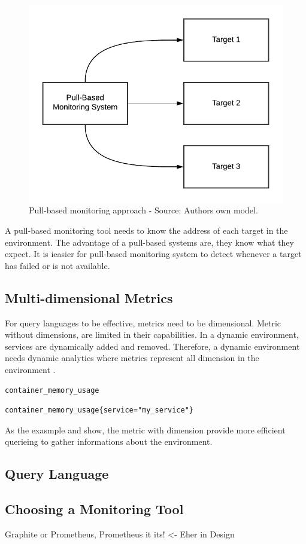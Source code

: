 \begin{figure}[h]%
\centering
\includegraphics[scale=0.8]{images/02_theoretical_foundation/monitoring/pull_based}%
\caption{Pull-based monitoring approach - Source: Authors own model.}%
\label{fig:mon_pull-based}%
\end{figure}
A pull-based monitoring tool needs to know the address of each target in the environment.
The advantage of a pull-based systems are, they know what they expect. It is ieasier for pull-based monitoring system to detect whenever a target has failed or is not available.


\subsection{Multi-dimensional Metrics}
For query languages to be effective, metrics need to be dimensional. Metric without dimensions, are limited in their capabilities.
In a dynamic environment, services are dynamically added and removed. Therefore, a dynamic environment needs dynamic analytics where metrics represent all dimension in the environment \cite{Farcic2018Toolkit22}.
\begin{lstlisting}[frame=single, label=lst:mon_metr_dimless, caption=Example of a dimensionless-metric, captionpos=b]
container_memory_usage
\end{lstlisting}
\begin{lstlisting}[frame=single, label=lst:mon_metr_withdim, caption=Example of a metric with dimensions, captionpos=b]
container_memory_usage{service="my_service"}
\end{lstlisting}
As the exasmple  and  show, the metric with dimension provide more efficient querieing to gather informations about the environment.


\subsection{Query Language}



\subsection{Choosing a Monitoring Tool}
Graphite or Prometheus, Prometheus it its! <- Eher in Design
